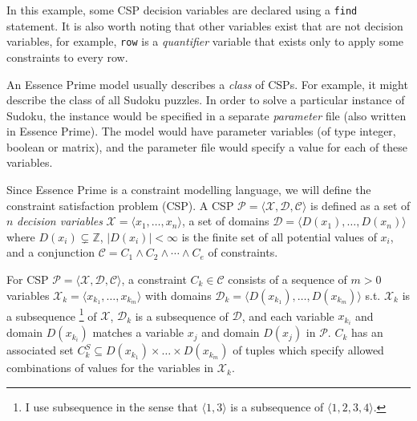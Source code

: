 \documentclass[a4paper]{article}
\newcommand{\comment}[1]{}
\newcommand{\eprime}{{\sc Essence Prime}\xspace}
\begin{document}
In this example, some CSP decision variables are declared using a \texttt{find} statement. 
It is also worth noting that other variables exist that are not decision variables,
for example, \texttt{row} is a \textit{quantifier} variable that exists only to apply some 
constraints to every row. 

An \eprime model usually describes a \textit{class} of CSPs. For example, it 
might describe the class of all Sudoku puzzles. In order to solve a particular
instance of Sudoku, the instance would be specified in a separate \textit{parameter} file (also 
written in \eprime). The model would have parameter variables (of type integer, boolean or matrix), 
and the parameter file would specify a value for each of these variables. 



Since \eprime is a constraint modelling language, we will define the
constraint satisfaction problem (CSP). 
A CSP $\mathcal{P}=\langle\mathcal{X},\mathcal{D},\mathcal{C}\rangle$
is defined as a set of $n$ \textit{decision variables} 
$\mathcal{X}=\langle x_{1},\dots,x_{n}\rangle$,
a set of domains $\mathcal{D}=\langle D(x_{1}),\dots,D(x_{n})\rangle$ where
$D(x_{i})\subsetneq\mathbb{Z}$, $\left|D(x_{i})\right|<\infty$ is the
finite set of all potential values of $x_{i}$, and a conjunction
$\mathcal{C}=C_{1}\wedge C_{2}\wedge\cdots\wedge C_{e}$ of constraints. 

For CSP $\mathcal{P}=\langle\mathcal{X},\mathcal{D},\mathcal{C}\rangle$,
a constraint $C_{k}\in\mathcal{C}$ consists of a sequence of $m>0$
variables $\mathcal{X}_{k}=\langle x_{k_{1}},\dots,x_{k_{m}}\rangle$
with domains $\mathcal{D}_{k}=\langle D(x_{k_{1}}),\ldots,D(x_{k_{m}})\rangle$
s.t. $\mathcal{X}_{k}$ is a subsequence%
\footnote{I use subsequence in the sense that $\langle1,3\rangle$ is a subsequence 
of $\langle1,2,3,4\rangle$.%
} of $\mathcal{X}$, $\mathcal{D}_{k}$ is a subsequence of $\mathcal{D}$,
and each variable $x_{k_{i}}$ and domain $D(x_{k_{i}})$ matches a variable
$x_{j}$ and domain $D(x_{j})$ in $\mathcal{P}$. $C_{k}$ has an associated
set $C_{k}^{S}\subseteq D(x_{k_{1}})\times\dots\times D(x_{k_{m}})$ of
tuples which specify allowed combinations of values for the variables
in $\mathcal{X}_{k}$. 



\comment{
forAll subsqrow : int(1,4,7) .      $ subsqrow and subsqcol are the top-left corner 
    forAll subsqcol : int(1,4,7) .  $ of the subsquare. 
        forAll row1 : int(1..3) . 
            forAll row2 : int(1..3) .
                forAll col1 : int(1..3) .
                    forAll col2 : int(1..3) .
                        (row1!=row2 \/ col1!=col2) -> M[subsqrow+row1,subsqcol+col1]!=M[subsqrow+row2,subsqcol+col2]
}
\end{document}
